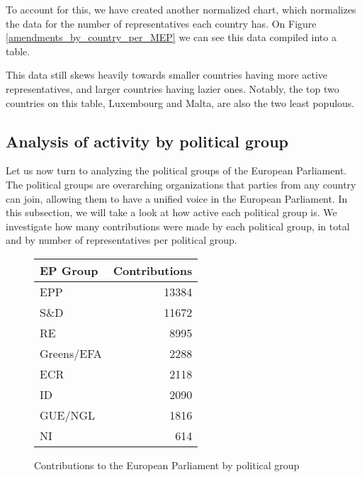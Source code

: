 \documentclass[lettersize,journal]{IEEEtran}
\begin{document}
To account for this, we have created another normalized chart, which normalizes the data for the number of representatives each country has. On Figure \ref{amendments_by_country_per_MEP} we can see this data compiled into a table.

This data still skews heavily towards smaller countries having more active representatives, and larger countries having lazier ones. Notably, the top two countries on this table, Luxembourg and Malta, are also the two least populous.

\subsection{Analysis of activity by political group} \label{epgroupactivity}

Let us now turn to analyzing the political groups of the European Parliament. The political groups are overarching organizations that parties from any country can join, allowing them to have a unified voice in the European Parliament. In this subsection, we will take a look at how active each political group is. We investigate how many contributions were made by each political group, in total and by number of representatives per political group.


\begin{figure}[h]
	\begin{center}
		\begin{tabular}{| l | r |}
			\hline
			EP Group & Contributions\\
			\hline
			EPP & 13384 \\
			S\&D & 11672 \\
			RE & 8995 \\
			Greens/EFA & 2288 \\
			ECR & 2118 \\
			ID & 2090 \\
			GUE/NGL & 1816 \\
			NI & 614 \\
			\hline
		\end{tabular}
		\caption{Contributions to the European Parliament by political group}
		\label{epgroup_contributions}
	\end{center}
\end{figure}
\end{document}
